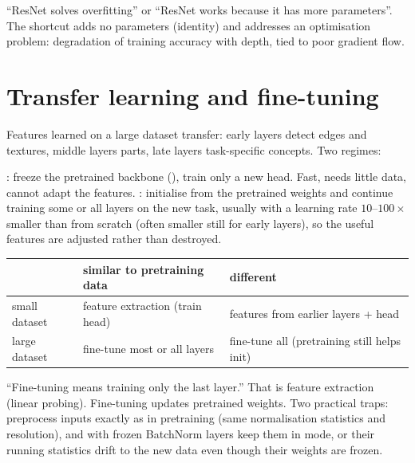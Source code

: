 \begin{remark}
	\trap ``ResNet solves overfitting'' or ``ResNet works because it has more parameters''. The shortcut
	adds no parameters (identity) and addresses an optimisation problem: degradation of training accuracy
	with depth, tied to poor gradient flow.
\end{remark}

\section{Transfer learning and fine-tuning}

Features learned on a large dataset transfer: early layers detect edges and textures, middle layers
parts, late layers task-specific concepts. Two regimes:
\begin{itemize}
	\ii {}: freeze the pretrained backbone (), train only
	a new head. Fast, needs little data, cannot adapt the features.
	\ii {}: initialise from the pretrained weights and continue training some or all
	layers on the new task, usually with a learning rate $10$--$100\times$ smaller than from scratch (often
	smaller still for early layers), so the useful features are adjusted rather than destroyed.
\end{itemize}
\begin{center}
	\small
	\begin{tabular}{lll}
		\toprule
		& similar to pretraining data & different \\
		\midrule
		small dataset & feature extraction (train head) & features from earlier layers + head \\
		large dataset & fine-tune most or all layers & fine-tune all (pretraining still helps init) \\
		\bottomrule
	\end{tabular}
\end{center}

\begin{remark}
	\trap ``Fine-tuning means training only the last layer.'' That is feature extraction (linear probing).
	Fine-tuning updates pretrained weights. Two practical traps: preprocess inputs exactly as in
	pretraining (same normalisation statistics and resolution), and with frozen BatchNorm layers keep them
	in  mode, or their running statistics drift to the new data even though their weights are
	frozen.
\end{remark}


